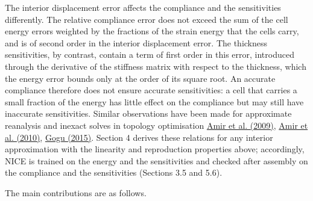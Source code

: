 \documentclass[preprint,12pt,authoryear]{elsarticle}
\begin{document}
The interior displacement error affects the compliance and the sensitivities differently. The relative compliance error does not exceed the sum of the cell energy errors weighted by the fractions of the strain energy that the cells carry, and is of second order in the interior displacement error. The thickness sensitivities, by contrast, contain a term of first order in this error, introduced through the derivative of the stiffness matrix with respect to the thickness, which the energy error bounds only at the order of its square root. An accurate compliance therefore does not ensure accurate sensitivities: a cell that carries a small fraction of the energy has little effect on the compliance but may still have inaccurate sensitivities. Similar observations have been made for approximate reanalysis and inexact solves in topology optimisation \href{https://doi.org/10.1002/nme.2536}{Amir et al. (2009)}, \href{https://doi.org/10.1007/s00158-009-0463-4}{Amir et al. (2010)}, \href{https://doi.org/10.1002/nme.4797}{Gogu (2015)}. Section 4 derives these relations for any interior approximation with the linearity and reproduction properties above; accordingly, NICE is trained on the energy and the sensitivities and checked after assembly on the compliance and the sensitivities (Sections 3.5 and 5.6).

The main contributions are as follows.
\end{document}
